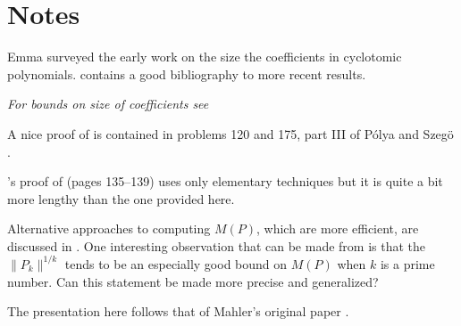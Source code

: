 \section*{Notes}

\footnotesize

Emma {\LehmerE} \cite{LehmerE36} surveyed the early work on the size the
coefficients in cyclotomic polynomials.  {\Apostol} \cite{Apostol75}
contains a good bibliography to more recent results.

{\em For bounds on size of coefficients see
\cite{Kannan:Lenstra:Lovasz,Mignotte82,Mignotte81} }

  A nice proof of
 is contained in problems 120 and 175,
part III of P\'olya and Szeg\"o \cite{Polya:Szego}.

{\Gelfond}'s proof of 
\cite{Gelfond:Transcendence} (pages 135--139) uses only elementary
techniques but it is quite a bit more lengthy than the one provided
here.

Alternative approaches to computing $M(P)$, which are more efficient,
are discussed in \cite{Cerlienco87}.  One interesting observation that
can be made from  is that the
$\|P_k\|^{1/k}$ tends to be an especially good bound on $M(P)$ when
$k$ is a prime number.  Can this statement be made more precise and
generalized? 

 The presentation here follows that
of Mahler's original paper \cite{Mahler64}.

\normalsize

